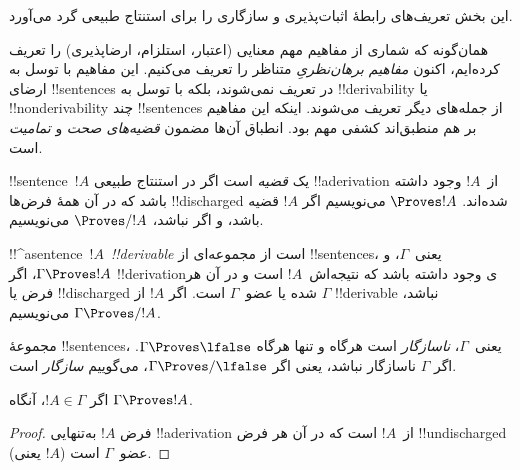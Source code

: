 \documentclass[../../../include/open-logic-section]{subfiles}
\begin{document}
      {}
      {}


\begin{editorial}
این بخش تعریف‌های رابطهٔ اثبات‌پذیری و سازگاری را برای استنتاج طبیعی
گرد می‌آورد.
\end{editorial}

\begin{explain}
همان‌گونه که شماری از مفاهیم مهم معنایی (اعتبار، استلزام، ارضاپذیری) را
تعریف کرده‌ایم، اکنون \emph{مفاهیم برهان‌نظریِ} متناظر را تعریف می‌کنیم.
این مفاهیم با توسل به ارضای !!{sentence}s در
 تعریف نمی‌شوند، بلکه با
توسل به !!{derivability} یا !!{nonderivability} چند !!{sentence}s از
جمله‌های دیگر تعریف می‌شوند. اینکه این مفاهیم بر هم منطبق‌اند کشفی مهم
بود. انطباق آن‌ها مضمون \emph{قضیه‌های صحت} و \emph{تمامیت} است.
\end{explain}


\begin{defn}[قضیه‌ها]
!!{sentence}~$!A$ یک \emph{قضیه} است اگر در استنتاج طبیعی
!!a{derivation} از~$!A$ وجود داشته باشد که در آن همهٔ فرض‌ها
!!{discharged} شده‌اند. $\Proves !A$ می‌نویسیم اگر $!A$ قضیه باشد، و اگر نباشد،
$\Proves/ !A$ می‌نویسیم.
\end{defn}

\begin{defn}[!!^{derivability}]
!!^a{sentence}~$!A$~\emph{!!{derivable}} است از مجموعه‌ای از
!!{sentence}s، یعنی~$\Gamma$، و $\Gamma \Proves !A$، اگر !!{derivation}ی
وجود داشته باشد که نتیجه‌اش~$!A$ است و در آن هر فرض یا !!{discharged}
شده یا عضو~$\Gamma$ است. اگر $!A$ از $\Gamma$ !!{derivable} نباشد،
$\Gamma \Proves/ !A$ می‌نویسیم.
\end{defn}

\begin{defn}[سازگاری]
مجموعهٔ !!{sentence}s، یعنی~$\Gamma$، \emph{ناسازگار} است هرگاه و تنها
هرگاه $\Gamma \Proves \lfalse$. اگر $\Gamma$ ناسازگار نباشد، یعنی اگر
$\Gamma \Proves/ \lfalse$، می‌گوییم \emph{سازگار} است.
\end{defn}

\begin{prop}
اگر $!A \in \Gamma$، آنگاه $\Gamma \Proves !A$.
\end{prop}

\begin{proof}
فرض $!A$ به‌تنهایی !!a{derivation} از~$!A$ است که در آن هر فرض
!!{undischarged} (یعنی $!A$) عضو~$\Gamma$ است.
\end{proof}
\end{document}
